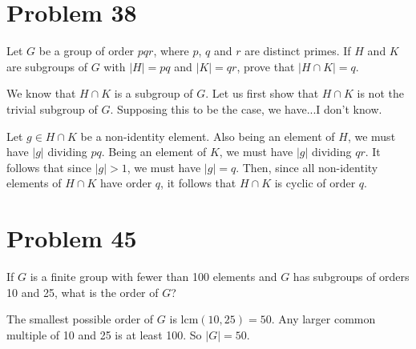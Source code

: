 \documentclass[12pt]{article}
\newcommand{\lcm}{\mbox{lcm}}
\begin{document}
\section*{Problem 38}

Let $G$ be a group of order $pqr$, where $p$, $q$ and $r$ are distinct primes.
If $H$ and $K$ are subgroups of $G$ with $|H|=pq$ and $|K|=qr$, prove
that $|H\cap K|=q$.

We know that $H\cap K$ is a subgroup of $G$.  Let us first show
that $H\cap K$ is not the trivial subgroup of $G$.  Supposing this
to be the case, we have...I don't know.

Let $g\in H\cap K$ be a non-identity element.
Also being an element of $H$, we must have $|g|$ dividing $pq$.
Being an element of $K$, we must have $|g|$ dividing $qr$.
It follows that since $|g|>1$, we must have $|g|=q$.
Then, since all non-identity elements of $H\cap K$ have order $q$,
it follows that $H\cap K$ is cyclic of order $q$.

\section*{Problem 45}

If $G$ is a finite group with fewer than 100 elements and $G$ has subgroups
of orders 10 and 25, what is the order of $G$?

The smallest possible order of $G$ is $\lcm(10,25)=50$.  Any larger
common multiple of 10 and 25 is at least 100.  So $|G|=50$.
\end{document}
